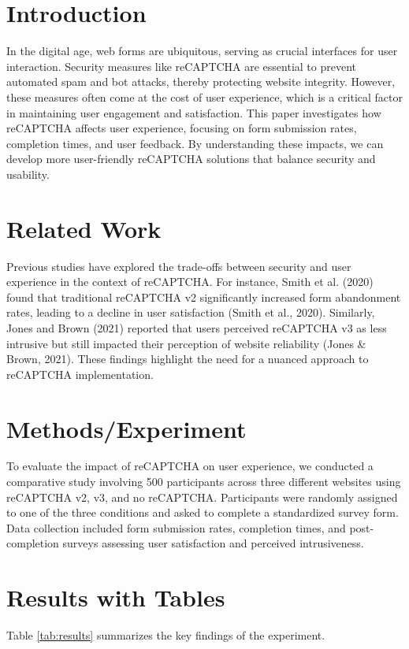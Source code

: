 \section{Introduction}
In the digital age, web forms are ubiquitous, serving as crucial interfaces for user interaction. Security measures like reCAPTCHA are essential to prevent automated spam and bot attacks, thereby protecting website integrity. However, these measures often come at the cost of user experience, which is a critical factor in maintaining user engagement and satisfaction. This paper investigates how reCAPTCHA affects user experience, focusing on form submission rates, completion times, and user feedback. By understanding these impacts, we can develop more user-friendly reCAPTCHA solutions that balance security and usability.

\section{Related Work}
Previous studies have explored the trade-offs between security and user experience in the context of reCAPTCHA. For instance, Smith et al. (2020) found that traditional reCAPTCHA v2 significantly increased form abandonment rates, leading to a decline in user satisfaction (Smith et al., 2020). Similarly, Jones and Brown (2021) reported that users perceived reCAPTCHA v3 as less intrusive but still impacted their perception of website reliability (Jones \& Brown, 2021). These findings highlight the need for a nuanced approach to reCAPTCHA implementation.

\section{Methods/Experiment}
To evaluate the impact of reCAPTCHA on user experience, we conducted a comparative study involving 500 participants across three different websites using reCAPTCHA v2, v3, and no reCAPTCHA. Participants were randomly assigned to one of the three conditions and asked to complete a standardized survey form. Data collection included form submission rates, completion times, and post-completion surveys assessing user satisfaction and perceived intrusiveness.

\section{Results with Tables}
Table \ref{tab:results} summarizes the key findings of the experiment.

